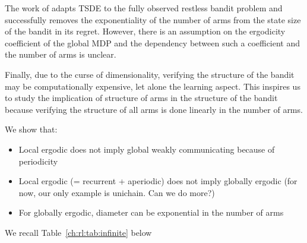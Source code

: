 The work of \cite{akbarzadeh2022learning} adapts TSDE to the fully observed restless bandit problem and successfully removes the exponentiality of the number of arms from the state size of the bandit in its regret.
However, there is an assumption on the ergodicity coefficient of the global MDP and the dependency between such a coefficient and the number of arms is unclear.

Finally, due to the curse of dimensionality, verifying the structure of the bandit may be computationally expensive, let alone the learning aspect.
This inspires us to study the implication of structure of arms in the structure of the bandit because verifying the structure of all arms is done linearly in the number of arms.






We show that:
\begin{itemize}
    \item Local ergodic does not imply global weakly communicating because of periodicity 
    \item Local ergodic (= recurrent + aperiodic) does not imply globally ergodic (for now, our only example is unichain. Can we do more?)
    \item For globally ergodic, diameter can be exponential in the number of arms
\end{itemize}

We recall Table~\ref{ch:rl:tab:infinite} below

